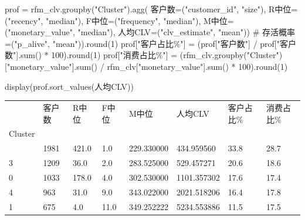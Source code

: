 \documentclass[
]{ctexart}
\newenvironment{Shaded}{\begin{snugshade}}{\end{snugshade}}
\newcommand{\BuiltInTok}[1]{\textcolor[rgb]{0.00,0.23,0.31}{#1}}
\newcommand{\CommentTok}[1]{\textcolor[rgb]{0.37,0.37,0.37}{#1}}
\newcommand{\DecValTok}[1]{\textcolor[rgb]{0.68,0.00,0.00}{#1}}
\newcommand{\NormalTok}[1]{\textcolor[rgb]{0.00,0.23,0.31}{#1}}
\newcommand{\OperatorTok}[1]{\textcolor[rgb]{0.37,0.37,0.37}{#1}}
\newcommand{\StringTok}[1]{\textcolor[rgb]{0.13,0.47,0.30}{#1}}
\newcounter{none} %
\begin{document}
\begin{Shaded}
\begin{Highlighting}[]
\NormalTok{prof }\OperatorTok{=}\NormalTok{ rfm\_clv.groupby(}\StringTok{"Cluster"}\NormalTok{).agg(}
\NormalTok{    客户数}\OperatorTok{=}\NormalTok{(}\StringTok{"customer\_id"}\NormalTok{, }\StringTok{"size"}\NormalTok{),}
\NormalTok{    R中位}\OperatorTok{=}\NormalTok{(}\StringTok{"recency"}\NormalTok{, }\StringTok{"median"}\NormalTok{), }
\NormalTok{    F中位}\OperatorTok{=}\NormalTok{(}\StringTok{"frequency"}\NormalTok{, }\StringTok{"median"}\NormalTok{),}
\NormalTok{    M中位}\OperatorTok{=}\NormalTok{(}\StringTok{"monetary\_value"}\NormalTok{, }\StringTok{"median"}\NormalTok{),}
\NormalTok{    人均CLV}\OperatorTok{=}\NormalTok{(}\StringTok{"clv\_estimate"}\NormalTok{, }\StringTok{"mean"}\NormalTok{))}
    \CommentTok{\# 存活概率=("p\_alive", "mean")).round(1)}
\NormalTok{prof[}\StringTok{"客户占比\%"}\NormalTok{] }\OperatorTok{=}\NormalTok{ (prof[}\StringTok{"客户数"}\NormalTok{] }\OperatorTok{/}\NormalTok{ prof[}\StringTok{"客户数"}\NormalTok{].}\BuiltInTok{sum}\NormalTok{() }\OperatorTok{*} \DecValTok{100}\NormalTok{).}\BuiltInTok{round}\NormalTok{(}\DecValTok{1}\NormalTok{)}
\NormalTok{prof[}\StringTok{"消费占比\%"}\NormalTok{] }\OperatorTok{=}\NormalTok{ (rfm\_clv.groupby(}\StringTok{"Cluster"}\NormalTok{)[}\StringTok{"monetary\_value"}\NormalTok{].}\BuiltInTok{sum}\NormalTok{() }\OperatorTok{/}
\NormalTok{                     rfm\_clv[}\StringTok{"monetary\_value"}\NormalTok{].}\BuiltInTok{sum}\NormalTok{() }\OperatorTok{*} \DecValTok{100}\NormalTok{).}\BuiltInTok{round}\NormalTok{(}\DecValTok{1}\NormalTok{)}

\NormalTok{display(prof.sort\_values(}\StringTok{\textquotesingle{}人均CLV\textquotesingle{}}\NormalTok{))}
\end{Highlighting}
\end{Shaded}

{\def\LTcaptype{none} %
\begin{longtable}[]{@{}llllllll@{}}
\toprule\noalign{}
& 客户数 & R中位 & F中位 & M中位 & 人均CLV & 客户占比\% & 消费占比\% \\
Cluster & & & & & & & \\
\midrule\noalign{}
\endhead
\bottomrule\noalign{}
\endlastfoot
2 & 1981 & 421.0 & 1.0 & 229.330000 & 434.959560 & 33.8 & 28.7 \\
3 & 1209 & 36.0 & 2.0 & 283.525000 & 529.457271 & 20.6 & 18.6 \\
0 & 1033 & 178.0 & 4.0 & 302.530000 & 1101.357302 & 17.6 & 17.4 \\
4 & 963 & 31.0 & 9.0 & 343.022000 & 2021.518206 & 16.4 & 17.8 \\
1 & 675 & 4.0 & 11.0 & 349.252222 & 5234.553886 & 11.5 & 17.5 \\
\end{longtable}
}
\end{document}
